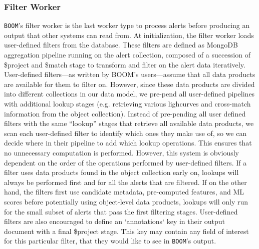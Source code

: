 \documentclass[twocolumn]{aastex631}
\begin{document}
\subsubsection{Filter Worker}
\label{sec:filter}
\texttt{BOOM}'s filter worker is the last worker type to process alerts before producing an output that other systems can read from. At initialization, the filter worker loads user-defined filters from the database. These filters are defined as MongoDB aggregation pipeline running on the alert collection, composed of a succession of \$project and \$match stage to transform and filter on the alert data iteratively. User-defined filters---as  written by BOOM's users---assume that all data products are available for them to filter on. However, since these data products are divided into different collections in our data model, we pre-pend all user-defined pipelines with additional lookup stages (e.g. retrieving various lighcurves and cross-match information from the object collection). Instead of pre-pending all user defined filters with the same ``lookup'' stages that retrieve all available data products, we scan each user-defined filter to identify which ones they make use of, so we can decide where in their pipeline to add which lookup operations. This ensures that no unnecessary computation is performed. However, this system is obviously dependent on the order of the operations performed by user-defined filters. If a filter uses data products found in the object collection early on, lookups will always be performed first and for all the alerts that are filtered. If on the other hand, the filters first use candidate metadata, pre-computed features, and ML scores before potentially using object-level data products, lookups will only run for the small subset of alerts that pass the first filtering stages. User-defined filters are also encouraged to define an `annotations` key in their output document with a final \$project stage. This key may contain any field of interest for this particular filter, that they would like to see in \texttt{BOOM}'s output.
\end{document}
